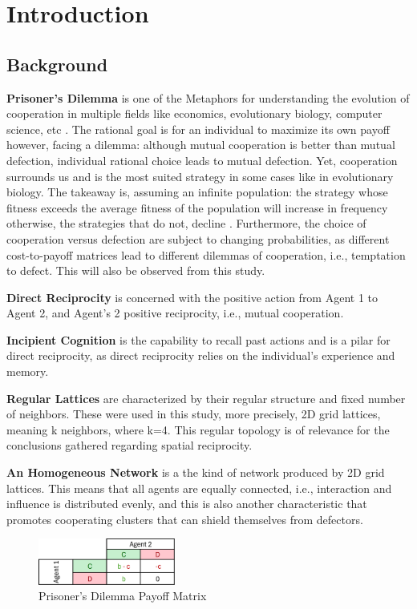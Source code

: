 \documentclass[runningheads]{llncs}
\begin{document}
\section{Introduction}

\subsection{Background}


\textbf{Prisoner's Dilemma} is one of the Metaphors for understanding the evolution of cooperation
in multiple fields like economics, evolutionary biology, computer science, etc \cite{mm2024}.
The rational goal is for an individual to maximize its own payoff however, facing a
dilemma: although mutual cooperation is better than mutual defection, individual rational
choice leads to mutual defection. Yet, cooperation surrounds us and is the most suited
strategy in some cases like in evolutionary biology. The takeaway is, assuming
an infinite population: the strategy whose fitness exceeds the average fitness
of the population will increase in frequency otherwise, the strategies that do not,
decline \cite{mm2024}. Furthermore, the choice of cooperation versus defection are
subject to changing probabilities, as different cost-to-payoff matrices lead to
different dilemmas of cooperation, i.e., temptation to defect.
This will also be observed from this study.

\textbf{Direct Reciprocity} is concerned with the positive action from Agent 1
to Agent 2, and Agent's 2 positive reciprocity, i.e., mutual cooperation.

\textbf{Incipient Cognition} is the capability to recall past actions and is
a pilar for direct reciprocity, as direct reciprocity
relies on the individual's experience and memory.

\textbf{Regular Lattices} are characterized by their regular structure and fixed
number of neighbors. These were used in this study, more precisely,
2D grid lattices, meaning k neighbors, where k=4. This regular topology is of relevance
for the conclusions gathered regarding spatial reciprocity.

\textbf{An Homogeneous Network} is a the kind of network produced by 2D
grid lattices. This means that all agents are equally connected, i.e.,
interaction and influence is distributed evenly, and this is also
another characteristic that promotes cooperating clusters that can shield themselves
from defectors.

\begin{figure}[htbp]
    \centering
    \includegraphics[width=0.4\textwidth]{payoffmatrix.png}
    \caption{Prisoner's Dilemma Payoff Matrix}
    \label{fig:coop_vs_b}
\end{figure}
\end{document}
